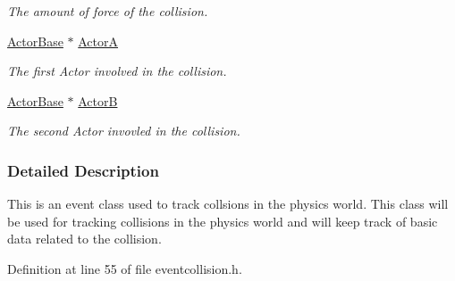 \begin{DoxyCompactItemize}
\begin{DoxyCompactList}\small\item\em The amount of force of the collision. \item\end{DoxyCompactList}\item 
\hypertarget{classphys_1_1EventCollision_a2de905d0332c66293cbe990fe2dbbb07}{
\hyperlink{classphys_1_1ActorBase}{ActorBase} $\ast$ \hyperlink{classphys_1_1EventCollision_a2de905d0332c66293cbe990fe2dbbb07}{ActorA}}
\label{dd/de9/classphys_1_1EventCollision_a2de905d0332c66293cbe990fe2dbbb07}

\begin{DoxyCompactList}\small\item\em The first Actor involved in the collision. \item\end{DoxyCompactList}\item 
\hypertarget{classphys_1_1EventCollision_a922fd42b74db6df7a59cb5fd54cbadbe}{
\hyperlink{classphys_1_1ActorBase}{ActorBase} $\ast$ \hyperlink{classphys_1_1EventCollision_a922fd42b74db6df7a59cb5fd54cbadbe}{ActorB}}
\label{dd/de9/classphys_1_1EventCollision_a922fd42b74db6df7a59cb5fd54cbadbe}

\begin{DoxyCompactList}\small\item\em The second Actor invovled in the collision. \item\end{DoxyCompactList}\end{DoxyCompactItemize}


\subsubsection{Detailed Description}
This is an event class used to track collsions in the physics world. This class will be used for tracking collisions in the physics world and will keep track of basic data related to the collision. 

Definition at line 55 of file eventcollision.h.



